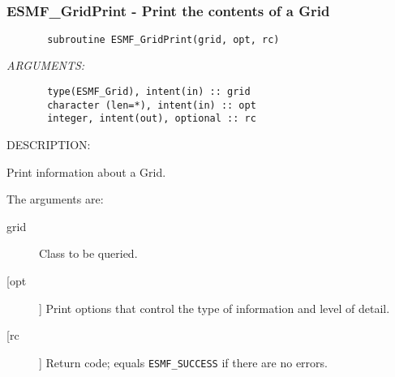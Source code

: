 \mbox{}\hrulefill\ 
 
\subsubsection{ESMF\_GridPrint - Print the contents of a Grid}


 
\begin{verbatim}       subroutine ESMF_GridPrint(grid, opt, rc)\end{verbatim}{\em ARGUMENTS:}
\begin{verbatim}       type(ESMF_Grid), intent(in) :: grid
       character (len=*), intent(in) :: opt
       integer, intent(out), optional :: rc\end{verbatim}
{\sf DESCRIPTION:\\ }


        Print information about a Grid.
  
       The arguments are:
       \begin{description}
       \item[grid]
            Class to be queried.
       \item[[opt]]
            Print options that control the type of information and level of
            detail.
       \item[[rc]]
            Return code; equals {\tt ESMF\_SUCCESS} if there are no errors.
       \end{description}
  
